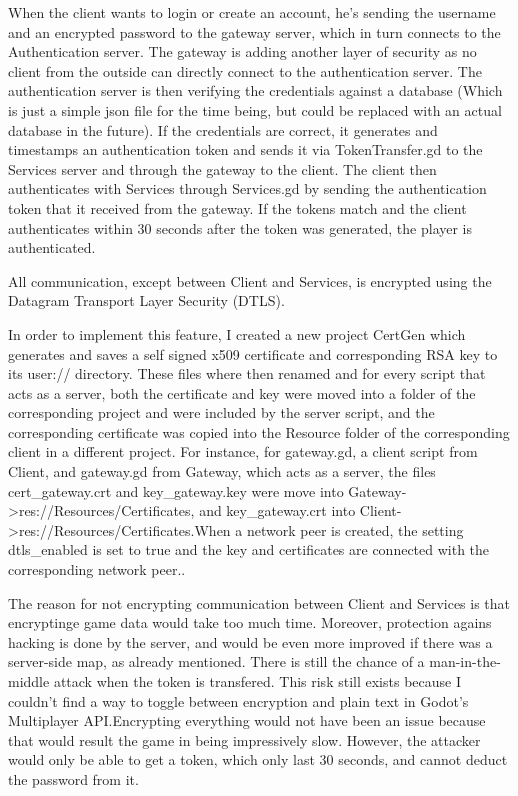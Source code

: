 \documentclass{article}
\begin{document}
When the client wants to login or create an account, he's sending the username and an encrypted password to the gateway server, which in turn connects to the Authentication server. The gateway is adding another layer of security as no client from the outside can directly connect to the authentication server. The authentication server is then verifying the credentials against a database (Which is just a simple json file for the time being, but could be replaced with an actual database in the future). If the credentials are correct, it generates and timestamps an authentication token and sends it via TokenTransfer.gd to the Services server and through the gateway to the client. The client then authenticates with Services through Services.gd by sending the authentication token that it received from the gateway. If the tokens match and the client authenticates within 30 seconds after the token was generated, the player is authenticated. 

All communication, except between Client and Services, is encrypted using the Datagram Transport Layer Security (DTLS). 

In order to implement this feature, I created a new project CertGen which generates and saves a self signed x509 certificate and corresponding RSA key to its user:// directory. These files where then renamed and for every script that acts as a server, both the certificate and key were moved into a folder of the corresponding project and were included by the server script, and the corresponding certificate was copied into the Resource folder of the corresponding client in a different project. For instance, for gateway.gd, a client script from Client, and gateway.gd from Gateway, which acts as a server, the files cert\_gateway.crt and key\_gateway.key were move into Gateway->res://Resources/Certificates, and key\_gateway.crt into Client->res://Resources/Certificates.When a network peer is created, the setting dtls\_enabled is set to true and the key and certificates are connected with the corresponding network peer..

The reason for not encrypting communication between Client and Services is that encryptinge game data would take too much time. Moreover, protection agains hacking is done by the server, and would be even more improved if there was a server-side map, as already mentioned. There is still the chance of a man-in-the-middle attack when the token is transfered. This risk still exists because I couldn't find a way to toggle between encryption and plain text in Godot's Multiplayer API.Encrypting everything would not have been an issue because that would result the game in being impressively slow. However, the attacker would only be able to get a token, which only last 30 seconds, and cannot deduct the password from it. 
\end{document}

